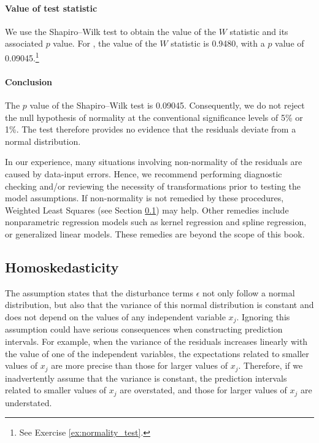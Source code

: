 \paragraph{Value of test statistic} We use the Shapiro--Wilk test to obtain the value of the $W$ statistic and its associated $p$ value. For , the value of the $W$ statistic is 0.9480, with a $p$ value of 0.09045.\footnote{See Exercise \ref{ex:normality_test}.}

\paragraph{Conclusion}

The $p$ value of the Shapiro--Wilk test is 0.09045. Con\-se\-quently, we do not reject the null hypothesis of normality at the conventional significance levels of 5\% or 1\%. The test therefore provides no evidence that the residuals deviate from a normal distribution.

\bigskip
In our experience, many situations involving non-normality of the residuals are caused by data-input errors. Hence, we recommend performing diagnostic checking and/or reviewing the necessity of transformations prior to testing the model assumptions. If non-normality is not remedied by these procedures, Weighted Least Squares (see Section \ref{sub:homoskedasticity}) may help. Other remedies include nonparametric regression models such as kernel regression and spline regression, or generalized linear models. These remedies are beyond the scope of this book.


\subsection{Homoskedasticity} %
\label{sub:homoskedasticity}

The  assumption states that the disturbance terms $\epsilon$ not only follow a normal distribution, but also that the variance of this normal distribution is constant and does not depend on the values of any independent variable $x_j$. Ignoring this assumption could have serious consequences when constructing prediction intervals. For example, when the variance of the residuals increases linearly with the value of one of the independent variables, the expectations related to smaller values of $x_j$ are more precise than those for larger values of $x_j$. Therefore, if we inadvertently assume that the variance is constant, the prediction intervals related to smaller values of $x_j$ are overstated, and those for larger values of $x_j$ are understated. 


